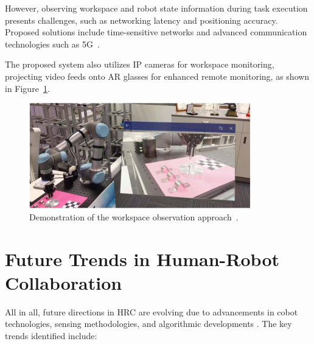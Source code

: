 However, observing workspace and robot state information during task execution presents challenges, such as networking latency and positioning accuracy. Proposed solutions include time-sensitive networks and advanced communication technologies such as 5G~\cite{LI2022102321}.

The proposed system also utilizes \ac{IP} cameras for workspace monitoring, projecting video feeds onto \ac{AR} glasses for enhanced remote monitoring, as shown in Figure~\ref{f:workspace-visualization}.

\begin{figure}[!htpb]
    \centering
    \includegraphics[width=0.7\linewidth]{figs/workspace-visualization.jpg}
    \caption{Demonstration of the workspace observation approach~\cite{LI2022102321}.}
    \label{f:workspace-visualization}
\end{figure}
\FloatBarrier




\section{Future Trends in Human-Robot Collaboration}

All in all, future directions in \ac{HRC} are evolving due to advancements in cobot technologies, sensing methodologies, and algorithmic developments \cite{robotics8040100}. The key trends identified include:

